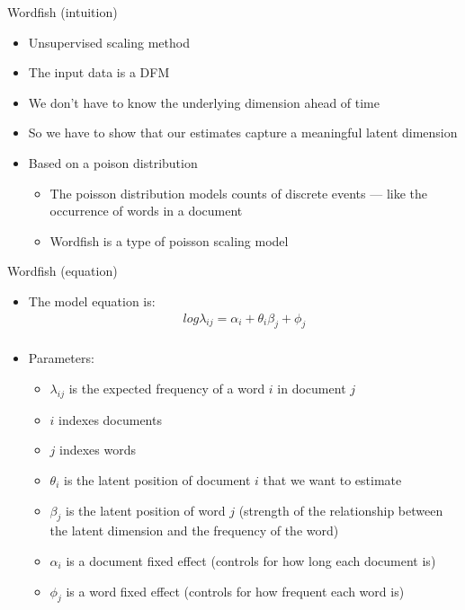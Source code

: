 \documentclass[pdf, 9pt, fleqn, handout]{beamer}
\begin{document}
\begin{frame}{Wordfish (intuition)}
\begin{itemize}
\item Unsupervised scaling method \\[1em]
\item The input data is a DFM \\[1em]
\item We don't have to know the underlying dimension ahead of time \\[1em]
\item So we have to show that our estimates capture a meaningful latent dimension \\[1em]
\item Based on a poison distribution \\[0.5em]
\begin{itemize}
\item The poisson distribution models counts of discrete events — like the occurrence of words in a document \\[1em]
\item Wordfish is a type of poisson scaling model
\end{itemize}
\end{itemize}
\end{frame}

\begin{frame}{Wordfish (equation)}
\begin{itemize}
\item The model equation is:
\begin{align*}
log \lambda_{ij} = \alpha_i + \theta_i \beta_j + \phi_j \\[0.5em]
\end{align*}
\item Parameters: \\[0.5em]
\begin{itemize}
\item $\lambda_{ij}$ is the expected frequency of a word $i$ in document $j$ \\[0.5em]
\item $i$ indexes documents \\[0.5em]
\item $j$ indexes words \\[0.5em]
\item $\theta_i$ is the latent position of document $i$ that we want to estimate \\[0.5em]
\item $\beta_j$ is the latent position of word $j$ (strength of the relationship between the latent dimension and the frequency of the word) \\[0.5em]
\item $\alpha_i$ is a document fixed effect (controls for how long each document is) \\[0.5em]
\item $\phi_j$ is a word fixed effect (controls for how frequent each word is) \\[1em]
\end{itemize}
\end{itemize}
\end{frame}
\end{document}
